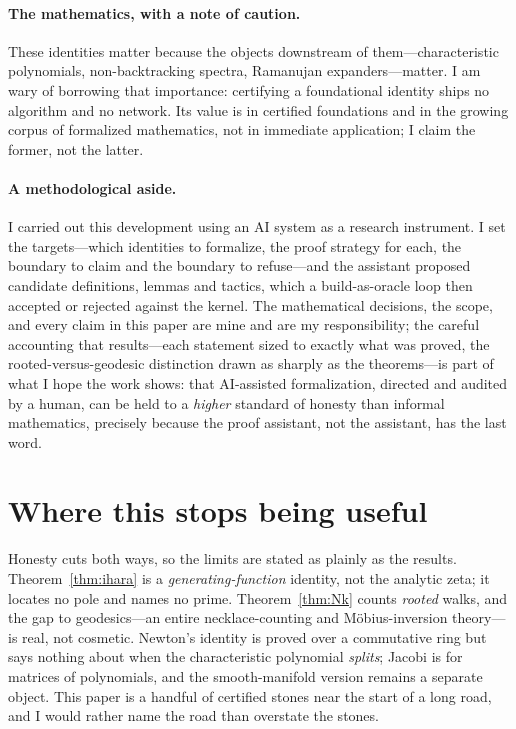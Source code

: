 \documentclass[11pt]{article}
\begin{document}
\paragraph{The mathematics, with a note of caution.}
These identities matter because the objects downstream of them---characteristic polynomials,
non-backtracking spectra, Ramanujan expanders---matter. I am wary of borrowing that importance:
certifying a foundational identity ships no algorithm and no network. Its value is in certified
foundations and in the growing corpus of formalized mathematics, not in immediate application; I
claim the former, not the latter.

\paragraph{A methodological aside.}
I carried out this development using an AI system as a research instrument. I set the
targets---which identities to formalize, the proof strategy for each, the boundary to claim and the
boundary to refuse---and the assistant proposed candidate definitions, lemmas and tactics, which a
build-as-oracle loop then accepted or rejected against the kernel. The mathematical decisions, the
scope, and every claim in this paper are mine and are my responsibility; the careful accounting that
results---each statement sized to exactly what was proved, the rooted-versus-geodesic distinction
drawn as sharply as the theorems---is part of what I hope the work shows: that AI-assisted
formalization, directed and audited by a human, can be held to a \emph{higher} standard of honesty
than informal mathematics, precisely because the proof assistant, not the assistant, has the last
word.

\section{Where this stops being useful}
\label{sec:context}

Honesty cuts both ways, so the limits are stated as plainly as the results. Theorem~\ref{thm:ihara}
is a \emph{generating-function} identity, not the analytic zeta; it locates no pole and names no
prime. Theorem~\ref{thm:Nk} counts \emph{rooted} walks, and the gap to geodesics---an entire
necklace-counting and M\"obius-inversion theory---is real, not cosmetic. Newton's identity is proved
over a commutative ring but says nothing about when the characteristic polynomial \emph{splits};
Jacobi is for matrices of polynomials, and the smooth-manifold version remains a separate object.
This paper is a handful of certified stones near the start of a long road, and I would rather name
the road than overstate the stones.
\end{document}
